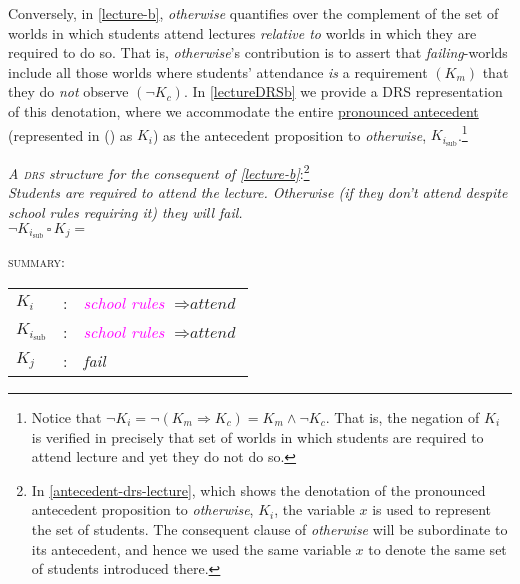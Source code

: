 Conversely, in \ref{lecture-b}, \textit{otherwise} quantifies over the complement of the set of worlds in which students attend lectures \textit{relative to} worlds in which they are required to do so. That is, \textit{otherwise}'s contribution is to assert that \textit{failing}-worlds include all those worlds where students' attendance \textit{is} a requirement $ (K_m) $ that they do \textit{not} observe $ (\neg K_c) $. In \ref{lectureDRSb} we provide a DRS representation of this denotation, where we accommodate the entire \uline{pronounced antecedent} (represented in (\blastx) as $K_i$) as the antecedent proposition to \textit{otherwise}, $K_{i_{\text{sub}}}$.\footnote{Notice that $ \neg K_i=\neg(K_m\Rightarrow K_c)=K_m\wedge\neg K_c $. That is, the negation of $K_i$ is verified in precisely that set of worlds in which students are required to attend lecture and yet they do not do so.}


\pex \label{lectureDRSb}\textit{A \textsc{drs} structure for the consequent of \ref{lecture-b}}:\footnote{In \ref{antecedent-drs-lecture}, which shows the denotation of the pronounced antecedent proposition to \textit{otherwise}, $K_i$, the variable $x$ is used to represent the set of students. The consequent clause of \textit{otherwise} will be subordinate to its antecedent, and hence we used the same variable $x$ to denote the same set of students introduced there.}	\\
\textit{Students are required to attend the lecture. 
	Otherwise \color{violet}(if they don't attend despite school rules requiring it) \color{black} they will fail.}\\
\hspace*{-3em} $\neg K_{i_{\text{sub}}}\,\square\,K_j =$ 
\begin{minipage}{.2\textwidth}
	\hspace{0.5em}
	\textsc{summary:} \\[6pt]
	\begin{tabular}{lc l}
		$K_i$ &:& \hspace{-0.2em}\textit{\scriptsize\textcolor{magenta}{school rules}} $\Rightarrow\textit{attend}$\\
		$K_{i_{\text{sub}}}$ &:& \hspace{-0.2em}\textit{\scriptsize\textcolor{magenta}{school rules}} $\Rightarrow\textit{attend}$\\
		$K_j$ &:& \textit{fail}\\
	\end{tabular}
\end{minipage}\xe


